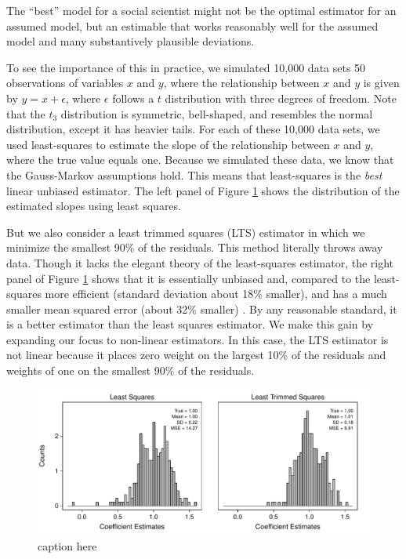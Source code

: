\documentclass[12pt]{article}
\begin{document}
\noindent The ``best'' model for a social scientist might not be the optimal estimator for an assumed model, but an estimable that works reasonably well for the assumed model and many substantively plausible deviations. 

To see the importance of this in practice, we simulated 10,000 data sets 50 observations of variables $x$ and $y$, where the relationship between $x$ and $y$ is given by $y = x + \epsilon$, where $\epsilon$ follows a $t$ distribution with three degrees of freedom. Note that the $t_3$ distribution is symmetric, bell-shaped, and resembles the normal distribution, except it has heavier tails. For each of these 10,000 data sets, we used least-squares to estimate the slope of the relationship between $x$ and $y$, where the true value equals one. Because we simulated these data, we know that the Gauss-Markov assumptions hold. This means that least-squares is the \textit{best} linear unbiased estimator. The left panel of Figure \ref{fig:lts-illustration} shows the distribution of the estimated slopes using least squares.

But we also consider a least trimmed squares (LTS) estimator in which we minimize the smallest 90\% of the residuals. This method literally throws away data. Though it lacks the elegant theory of the least-squares estimator, the right panel of Figure \ref{fig:lts-illustration} shows that it is essentially unbiased and, compared to the least-squares more efficient (standard deviation about 18\% smaller), and has a much smaller mean squared error (about 32\% smaller) . By any reasonable standard, it is a better estimator than the least squares estimator. We make this gain by expanding our focus to non-linear estimators. In this case, the LTS estimator is not linear because it places zero weight on the largest 10\% of the residuals and weights of one on the smallest 90\% of the residuals.

\begin{figure}[H]
\begin{center}
\includegraphics[scale = .7]{figs/lts-illustration.pdf}
\caption{caption here}\label{fig:lts-illustration}
\end{center}
\end{figure}
\end{document}
